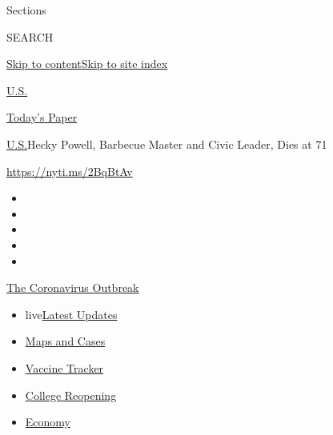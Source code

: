 Sections

SEARCH

\protect\hyperlink{site-content}{Skip to
content}\protect\hyperlink{site-index}{Skip to site index}

\href{https://www.nytimes.com/section/us}{U.S.}

\href{https://myaccount.nytimes.com/auth/login?response_type=cookie\&client_id=vi}{}

\href{https://www.nytimes.com/section/todayspaper}{Today's Paper}

\href{/section/us}{U.S.}\textbar{}Hecky Powell, Barbecue Master and
Civic Leader, Dies at 71

\url{https://nyti.ms/2BqBtAv}

\begin{itemize}
\item
\item
\item
\item
\item
\end{itemize}

\href{https://www.nytimes.com/news-event/coronavirus?action=click\&pgtype=Article\&state=default\&region=TOP_BANNER\&context=storylines_menu}{The
Coronavirus Outbreak}

\begin{itemize}
\tightlist
\item
  live\href{https://www.nytimes.com/2020/08/03/world/coronavirus-covid-19.html?action=click\&pgtype=Article\&state=default\&region=TOP_BANNER\&context=storylines_menu}{Latest
  Updates}
\item
  \href{https://www.nytimes.com/interactive/2020/us/coronavirus-us-cases.html?action=click\&pgtype=Article\&state=default\&region=TOP_BANNER\&context=storylines_menu}{Maps
  and Cases}
\item
  \href{https://www.nytimes.com/interactive/2020/science/coronavirus-vaccine-tracker.html?action=click\&pgtype=Article\&state=default\&region=TOP_BANNER\&context=storylines_menu}{Vaccine
  Tracker}
\item
  \href{https://www.nytimes.com/2020/08/02/us/covid-college-reopening.html?action=click\&pgtype=Article\&state=default\&region=TOP_BANNER\&context=storylines_menu}{College
  Reopening}
\item
  \href{https://www.nytimes.com/live/2020/08/03/business/stock-market-today-coronavirus?action=click\&pgtype=Article\&state=default\&region=TOP_BANNER\&context=storylines_menu}{Economy}
\end{itemize}

